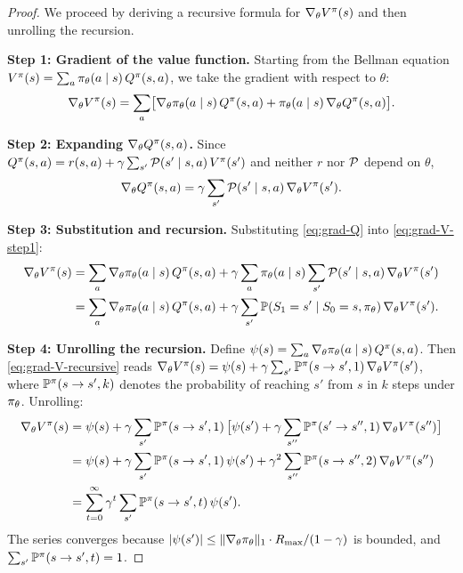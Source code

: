 \documentclass[11pt,a4paper]{article}
\begin{document}
\begin{proof}
We proceed by deriving a recursive formula for $\nabla_\theta V^{\pi}(s)$
and then unrolling the recursion.

\textbf{Step 1: Gradient of the value function.}
Starting from the Bellman equation
$V^{\pi}(s) = \sum_a \pi_\theta(a \mid s)\, Q^{\pi}(s,a)$,
we take the gradient with respect to $\theta$:
\begin{equation}
\label{eq:grad-V-step1}
  \nabla_\theta V^{\pi}(s)
  = \sum_a \bigl[\nabla_\theta \pi_\theta(a \mid s)\, Q^{\pi}(s,a)
    + \pi_\theta(a \mid s)\, \nabla_\theta Q^{\pi}(s,a)\bigr].
\end{equation}

\textbf{Step 2: Expanding $\nabla_\theta Q^{\pi}(s,a)$.}
Since $Q^{\pi}(s,a) = r(s,a) + \gamma \sum_{s'} \mathcal{P}(s' \mid s,a)\,
V^{\pi}(s')$ and neither $r$ nor $\mathcal{P}$ depend on $\theta$,
\begin{equation}
\label{eq:grad-Q}
  \nabla_\theta Q^{\pi}(s,a)
  = \gamma \sum_{s'} \mathcal{P}(s' \mid s,a)\, \nabla_\theta V^{\pi}(s').
\end{equation}

\textbf{Step 3: Substitution and recursion.}
Substituting \eqref{eq:grad-Q} into \eqref{eq:grad-V-step1}:
\begin{align}
  \nabla_\theta V^{\pi}(s)
  &= \sum_a \nabla_\theta \pi_\theta(a \mid s)\, Q^{\pi}(s,a)
     + \gamma \sum_a \pi_\theta(a \mid s) \sum_{s'} \mathcal{P}(s' \mid s,a)\,
       \nabla_\theta V^{\pi}(s') \nonumber \\
  &= \sum_a \nabla_\theta \pi_\theta(a \mid s)\, Q^{\pi}(s,a)
     + \gamma \sum_{s'} \mathbb{P}(S_1 = s' \mid S_0 = s, \pi_\theta)\,
       \nabla_\theta V^{\pi}(s'). \label{eq:grad-V-recursive}
\end{align}

\textbf{Step 4: Unrolling the recursion.}
Define $\psi(s) = \sum_a \nabla_\theta \pi_\theta(a \mid s)\,
Q^{\pi}(s,a)$. Then \eqref{eq:grad-V-recursive} reads
$\nabla_\theta V^{\pi}(s) = \psi(s) + \gamma \sum_{s'}
\mathbb{P}^{\pi}(s \to s', 1)\, \nabla_\theta V^{\pi}(s')$, where
$\mathbb{P}^{\pi}(s \to s', k)$ denotes the probability of reaching $s'$
from $s$ in $k$ steps under $\pi_\theta$. Unrolling:
\begin{align*}
  \nabla_\theta V^{\pi}(s)
  &= \psi(s) + \gamma \sum_{s'} \mathbb{P}^{\pi}(s \to s', 1)\,
     \bigl[\psi(s') + \gamma \sum_{s''} \mathbb{P}^{\pi}(s' \to s'', 1)\,
     \nabla_\theta V^{\pi}(s'')\bigr] \\
  &= \psi(s) + \gamma \sum_{s'} \mathbb{P}^{\pi}(s \to s', 1)\, \psi(s')
     + \gamma^2 \sum_{s''} \mathbb{P}^{\pi}(s \to s'', 2)\,
     \nabla_\theta V^{\pi}(s'') \\
  &= \sum_{t=0}^{\infty} \gamma^t \sum_{s'}
     \mathbb{P}^{\pi}(s \to s', t)\, \psi(s').
\end{align*}
The series converges because $|\psi(s')| \leq
\|\nabla_\theta \pi_\theta\|_1 \cdot R_{\max}/(1-\gamma)$ is
bounded, and $\sum_{s'} \mathbb{P}^{\pi}(s \to s', t) = 1$.


\end{proof}
\end{document}
